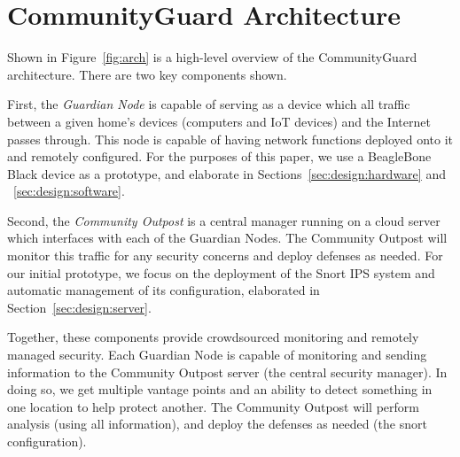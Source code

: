 \section{CommunityGuard Architecture}
\label{sec:arch}


Shown in Figure~\ref{fig:arch} is a high-level overview of the CommunityGuard architecture.
There are two key components shown.  

First, the \emph{Guardian Node} is capable of
serving as a device which all traffic between a given home's devices (computers and IoT devices)
and the Internet passes through.  This node is capable of having network functions
deployed onto it and remotely configured.  For the purposes of this paper,
we use a BeagleBone Black device as a prototype, and elaborate in Sections~\ref{sec:design:hardware} and ~\ref{sec:design:software}.

Second, the \emph{Community Outpost} is a central manager running on a cloud server which
interfaces with each of the Guardian Nodes. The Community Outpost will monitor this 
traffic for any security concerns and deploy defenses as needed.   
For our initial prototype, we focus on the deployment of the Snort IPS system 
and automatic management of its configuration, elaborated in Section~\ref{sec:design:server}.

Together, these components provide crowdsourced monitoring and remotely managed security.  
Each Guardian Node is capable of monitoring and sending information to the Community Outpost server
(the central security manager).  In doing so, we get multiple vantage points and an ability 
to detect something in one location to help protect another.  
The Community Outpost will perform analysis (using all information), and deploy the 
defenses as needed (the snort configuration).  
%
%
%

